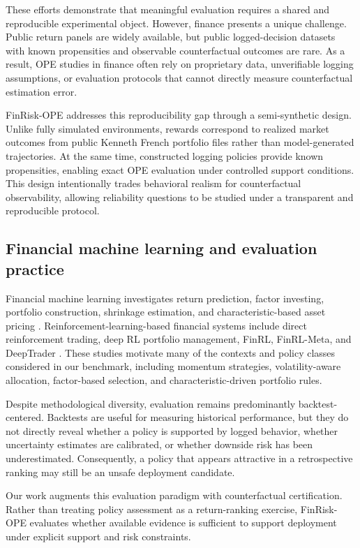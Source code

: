\documentclass[conference]{IEEEtran}
\begin{document}
These efforts demonstrate that meaningful evaluation requires a shared and reproducible experimental object. However, finance presents a unique challenge. Public return panels are widely available, but public logged-decision datasets with known propensities and observable counterfactual outcomes are rare. As a result, OPE studies in finance often rely on proprietary data, unverifiable logging assumptions, or evaluation protocols that cannot directly measure counterfactual estimation error.

FinRisk-OPE addresses this reproducibility gap through a semi-synthetic design. Unlike fully simulated environments, rewards correspond to realized market outcomes from public Kenneth French portfolio files rather than model-generated trajectories. At the same time, constructed logging policies provide known propensities, enabling exact OPE evaluation under controlled support conditions. This design intentionally trades behavioral realism for counterfactual observability, allowing reliability questions to be studied under a transparent and reproducible protocol.

\subsection{Financial machine learning and evaluation practice}

Financial machine learning investigates return prediction, factor investing, portfolio construction, shrinkage estimation, and characteristic-based asset pricing \cite{GuKX20,FengGX20,KozakNS20,KellyPS19,FreybergerNW20}. Reinforcement-learning-based financial systems include direct reinforcement trading, deep RL portfolio management, FinRL, FinRL-Meta, and DeepTrader \cite{MoodyS01,DengBKRD17,JiangXL17,LiuYLGW20,LiuYLGW22,WangHTZX21}. These studies motivate many of the contexts and policy classes considered in our benchmark, including momentum strategies, volatility-aware allocation, factor-based selection, and characteristic-driven portfolio rules.

Despite methodological diversity, evaluation remains predominantly backtest-centered. Backtests are useful for measuring historical performance, but they do not directly reveal whether a policy is supported by logged behavior, whether uncertainty estimates are calibrated, or whether downside risk has been underestimated. Consequently, a policy that appears attractive in a retrospective ranking may still be an unsafe deployment candidate.

Our work augments this evaluation paradigm with counterfactual certification. Rather than treating policy assessment as a return-ranking exercise, FinRisk-OPE evaluates whether available evidence is sufficient to support deployment under explicit support and risk constraints.
\end{document}
